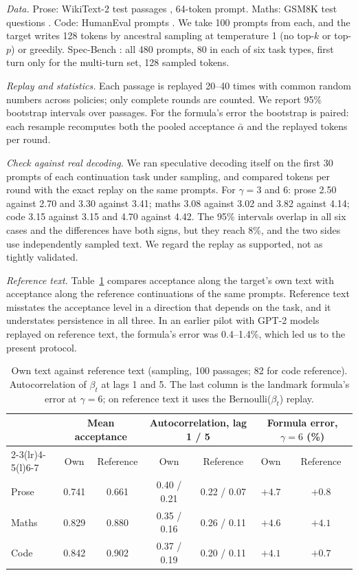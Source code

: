 \documentclass[10pt]{article}
\theoremstyle{remark}
\newcommand{\abar}{\bar{\alpha}}
\begin{document}
\emph{Data.} Prose: WikiText-2 test passages \cite{wikitext}, 64-token prompt. Maths: GSM8K test questions
\cite{gsm8k}. Code: HumanEval prompts \cite{humaneval}. We take 100 prompts from each, and the target writes 128
tokens by ancestral sampling at temperature 1 (no top-$k$ or top-$p$) or greedily. Spec-Bench \cite{specbench}: all
480 prompts, 80 in each of six task types, first turn only for the multi-turn set, 128 sampled tokens.

\emph{Replay and statistics.} Each passage is replayed 20--40 times with common random numbers across policies;
only complete rounds are counted. We report 95\% bootstrap intervals over passages. For the formula's error the
bootstrap is paired: each resample recomputes both the pooled acceptance $\abar$ and the replayed tokens per round.

\emph{Check against real decoding.} We ran speculative decoding itself on the first 30 prompts of each continuation
task under sampling, and compared tokens per round with the exact replay on the same prompts. For
$\gamma=3$ and $6$: prose 2.50 against 2.70 and 3.30 against 3.41; maths 3.08 against 3.02 and 3.82 against 4.14;
code 3.15 against 3.15 and 4.70 against 4.42. The 95\% intervals overlap in all six cases and the differences have
both signs, but they reach 8\%, and the two sides use independently sampled text. We regard the replay as
supported, not as tightly validated.

\emph{Reference text.} Table~\ref{tab:reference} compares acceptance along the target's own text with acceptance
along the reference continuations of the same prompts. Reference text misstates the acceptance level in a direction
that depends on the task, and it understates persistence in all three. In an earlier pilot with GPT-2 models
\cite{gpt2,distil} replayed on reference text, the formula's error was 0.4--1.4\%, which led us to the present protocol.

\begin{table}[t]
\centering\small
\caption{Own text against reference text (sampling, 100 passages; 82 for code reference). Autocorrelation of
$\beta_t$ at lags 1 and 5. The last column is the landmark formula's error at $\gamma=6$; on reference text it
uses the Bernoulli($\beta_t$) replay.}
\label{tab:reference}
\begin{tabular}{@{}lcccccc@{}}
\toprule
 & \multicolumn{2}{c}{Mean acceptance} & \multicolumn{2}{c}{Autocorrelation, lag 1 / 5} & \multicolumn{2}{c}{Formula error, $\gamma=6$ (\%)}\\
\cmidrule(lr){2-3}\cmidrule(lr){4-5}\cmidrule(l){6-7}
 & Own & Reference & Own & Reference & Own & Reference\\
\midrule
Prose & 0.741 & 0.661 & 0.40 / 0.21 & 0.22 / 0.07 & $+4.7$ & $+0.8$\\
Maths & 0.829 & 0.880 & 0.35 / 0.16 & 0.26 / 0.11 & $+4.6$ & $+4.1$\\
Code  & 0.842 & 0.902 & 0.37 / 0.19 & 0.20 / 0.11 & $+4.1$ & $+0.7$\\
\bottomrule
\end{tabular}
\end{table}
\end{document}

